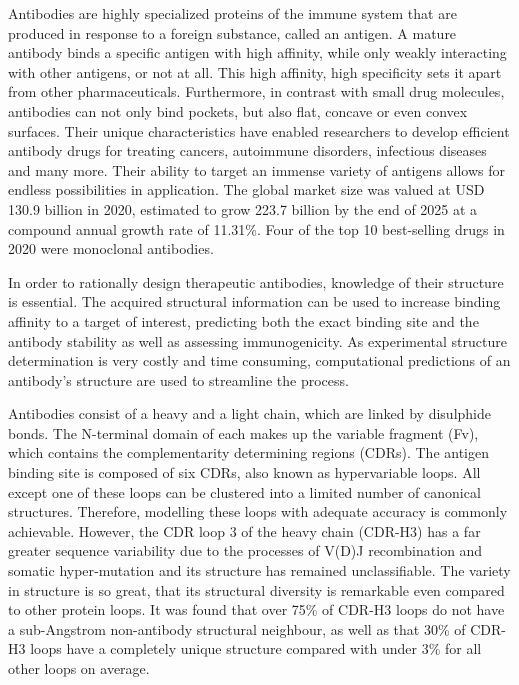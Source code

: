 \documentclass[12pt]{article}
\begin{document}
Antibodies are highly specialized proteins of the immune system that
are produced in response to a foreign substance, called an antigen. A
mature antibody binds a specific antigen with high affinity, while
only weakly interacting with other antigens, or not at all. This high
affinity, high specificity sets it apart from other pharmaceuticals.
Furthermore, in contrast with small drug molecules, antibodies can not
only bind pockets, but also flat, concave or even convex
surfaces\cite{Tavers2001}. Their unique characteristics have enabled 
researchers to develop efficient antibody drugs for treating cancers,
autoimmune disorders, infectious diseases and many more\cite{Lu2020}.
Their ability to target an immense variety of antigens allows for
endless possibilities in application. The global market size was
valued at USD 130.9 billion in 2020, estimated to grow 223.7 billion
by the end of 2025 at a compound annual growth rate of
11.31\%\cite{market2020}. Four of the top 10 best-selling drugs in
2020 were monoclonal antibodies\cite{Urquhart2021}.

In order to rationally design therapeutic antibodies, knowledge of
their structure is essential. The acquired structural information can
be used to increase binding affinity to a target of interest,
predicting both the exact binding site and the antibody stability as
well as assessing immunogenicity\cite{Abhinandan2007}. As
experimental structure determination is very costly and time
consuming, computational predictions of an antibody's structure are
used to streamline the process.

Antibodies consist of a heavy and a light chain, which are linked by
disulphide bonds. The N-terminal domain of each makes up the variable
fragment (Fv), which contains the complementarity determining regions
(CDRs). The antigen binding site is composed of six CDRs, also known
as hypervariable loops. All except one of these loops can be clustered
into a limited number of canonical structures. Therefore, modelling
these loops with adequate accuracy is commonly achievable\cite{North2011,Weitzner2015}. However, the CDR loop 3 of the
heavy chain (CDR-H3) has a far greater sequence variability due to the
processes of V(D)J recombination and somatic hyper‐mutation and its
structure has remained unclassifiable\cite{Finn2016}. The variety in
structure is so great, that its structural diversity is remarkable
even compared to other protein loops\cite{Regep2017}. It was found
that over 75\% of CDR-H3 loops do not have a sub-Angstrom non-antibody
structural neighbour, as well as that 30\% of CDR-H3 loops have a
completely unique structure compared with under 3\% for all other
loops on average\cite{Regep2017}.
\end{document}
